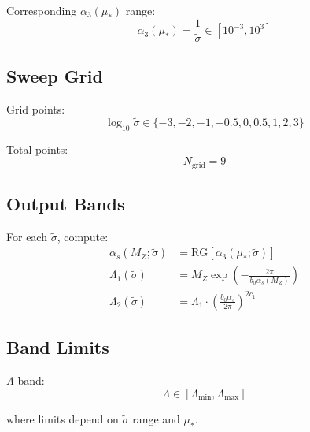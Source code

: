 \documentclass[11pt,a4paper]{article}
\theoremstyle{definition}
\begin{document}
Corresponding $\alpha_3(\mu_*)$ range:
\begin{equation}
\label{eq:app-alpha3-range}
\alpha_3(\mu_*) = \frac{1}{\tilde{\sigma}} \in [10^{-3}, 10^3]
\end{equation}

\subsection{Sweep Grid}
\label{subsec:sweep-grid}

Grid points:
\begin{equation}
\label{eq:app-grid}
\log_{10}\tilde{\sigma} \in \{-3, -2, -1, -0.5, 0, 0.5, 1, 2, 3\}
\end{equation}

Total points:
\begin{equation}
\label{eq:app-grid-count}
N_{\text{grid}} = 9
\end{equation}

\subsection{Output Bands}
\label{subsec:output-bands}

For each $\tilde{\sigma}$, compute:
\begin{align}
\label{eq:app-band-1}
\alpha_s(M_Z; \tilde{\sigma}) &= \text{RG}[\alpha_3(\mu_*; \tilde{\sigma})] \\
\label{eq:app-band-2}
\Lambda_1(\tilde{\sigma}) &= M_Z \exp\left(-\frac{2\pi}{b_0\alpha_s(M_Z)}\right) \\
\label{eq:app-band-3}
\Lambda_2(\tilde{\sigma}) &= \Lambda_1 \cdot \left(\frac{b_0\alpha_s}{2\pi}\right)^{2c_1}
\end{align}

\subsection{Band Limits}
\label{subsec:band-limits}

$\Lambda$ band:
\begin{equation}
\label{eq:app-lambda-band}
\Lambda \in [\Lambda_{\min}, \Lambda_{\max}]
\end{equation}

where limits depend on $\tilde{\sigma}$ range and $\mu_*$.

\end{document}
